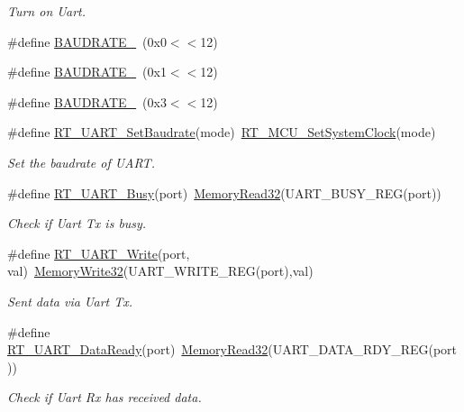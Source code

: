 \begin{DoxyCompactItemize}
\begin{DoxyCompactList}\small\item\em Turn on Uart. \end{DoxyCompactList}\item 
\#define \mbox{\hyperlink{a00056_a89d72bee69b33d0404d33f47608d16f0}{B\+A\+U\+D\+R\+A\+T\+E\+\_}}~(0x0$<$$<$12)
\item 
\#define \mbox{\hyperlink{a00056_ab94a89ecf1976f304764aec119e215e7}{B\+A\+U\+D\+R\+A\+T\+E\+\_}}~(0x1$<$$<$12)
\item 
\#define \mbox{\hyperlink{a00056_a9c74d2185a532185624b8dc3086f8e3e}{B\+A\+U\+D\+R\+A\+T\+E\+\_}}~(0x3$<$$<$12)
\item 
\#define \mbox{\hyperlink{a00056_a565befb27caf782083358e0ad81af3a3}{R\+T\+\_\+\+U\+A\+R\+T\+\_\+\+Set\+Baudrate}}(mode)~\mbox{\hyperlink{a00020_a017f8665ec51267680fc0e536db19c13}{R\+T\+\_\+\+M\+C\+U\+\_\+\+Set\+System\+Clock}}(mode)
\begin{DoxyCompactList}\small\item\em Set the baudrate of U\+A\+RT. \end{DoxyCompactList}\item 
\#define \mbox{\hyperlink{a00056_a3ab834a97a200601f16b923a705f3f01}{R\+T\+\_\+\+U\+A\+R\+T\+\_\+\+Busy}}(port)~\mbox{\hyperlink{a00020_a2d484dc15bdf30ee11ab3b05f31f0e16}{Memory\+Read32}}(U\+A\+R\+T\+\_\+\+B\+U\+S\+Y\+\_\+\+R\+EG(port))
\begin{DoxyCompactList}\small\item\em Check if Uart Tx is busy. \end{DoxyCompactList}\item 
\#define \mbox{\hyperlink{a00056_a3c30d4d2e260d1c2f96747e9d7bdaf0d}{R\+T\+\_\+\+U\+A\+R\+T\+\_\+\+Write}}(port,  val)~\mbox{\hyperlink{a00020_a6b9732365b12e48ddb89fe1028b975b0}{Memory\+Write32}}(U\+A\+R\+T\+\_\+\+W\+R\+I\+T\+E\+\_\+\+R\+EG(port),val)
\begin{DoxyCompactList}\small\item\em Sent data via Uart Tx. \end{DoxyCompactList}\item 
\#define \mbox{\hyperlink{a00056_abd2a573ae35e4f6381f9f9758a12806b}{R\+T\+\_\+\+U\+A\+R\+T\+\_\+\+Data\+Ready}}(port)~\mbox{\hyperlink{a00020_a2d484dc15bdf30ee11ab3b05f31f0e16}{Memory\+Read32}}(U\+A\+R\+T\+\_\+\+D\+A\+T\+A\+\_\+\+R\+D\+Y\+\_\+\+R\+EG(port))
\begin{DoxyCompactList}\small\item\em Check if Uart Rx has received data. \end{DoxyCompactList}\item 
$$
\end{DoxyCompactItemize}
